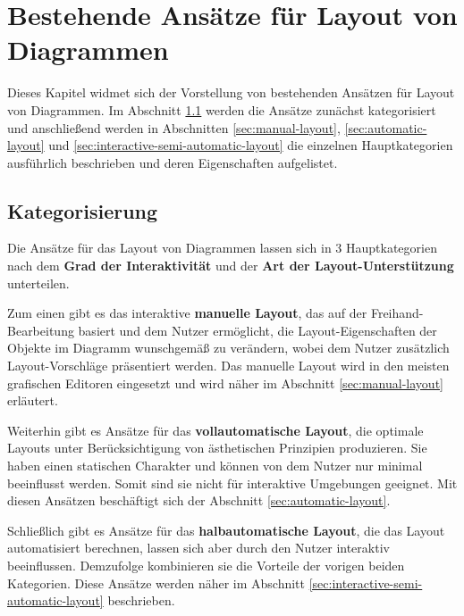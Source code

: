 
\chapter{Bestehende Ansätze für Layout von Diagrammen}
\label{chapter:existing-approaches}

Dieses Kapitel widmet sich der Vorstellung von bestehenden Ansätzen für Layout von Diagrammen. Im Abschnitt \ref{sec:categorization} werden die Ansätze zunächst kategorisiert und anschließend werden in Abschnitten \ref{sec:manual-layout}, \ref{sec:automatic-layout} und \ref{sec:interactive-semi-automatic-layout} die einzelnen Hauptkategorien ausführlich beschrieben und deren Eigenschaften aufgelistet.

\section{Kategorisierung}
\label{sec:categorization}

Die Ansätze für das Layout von Diagrammen lassen sich in 3 Hauptkategorien nach dem \textbf{Grad der Interaktivität} und der \textbf{Art der Layout-Unterstützung} unterteilen.

Zum einen gibt es das interaktive \textbf{manuelle Layout}, das auf der Freihand-Bearbeitung basiert und dem Nutzer ermöglicht, die Layout-Eigenschaften der Objekte im Diagramm wunschgemäß zu verändern, wobei dem Nutzer zusätzlich Layout-Vorschläge präsentiert werden. Das manuelle Layout wird in den meisten grafischen Editoren eingesetzt und wird näher im Abschnitt \ref{sec:manual-layout} erläutert.

Weiterhin gibt es Ansätze für das \textbf{vollautomatische Layout}, die optimale Layouts unter Berücksichtigung von ästhetischen Prinzipien produzieren. Sie haben einen statischen Charakter und können von dem Nutzer nur minimal beeinflusst werden. Somit sind sie nicht für interaktive Umgebungen geeignet. Mit diesen Ansätzen beschäftigt sich der Abschnitt \ref{sec:automatic-layout}.

Schließlich gibt es Ansätze für das \textbf{halbautomatische Layout}, die das Layout automatisiert berechnen, lassen sich aber durch den Nutzer interaktiv beeinflussen. Demzufolge kombinieren sie die Vorteile der vorigen beiden Kategorien. Diese Ansätze werden näher im Abschnitt \ref{sec:interactive-semi-automatic-layout} beschrieben.

